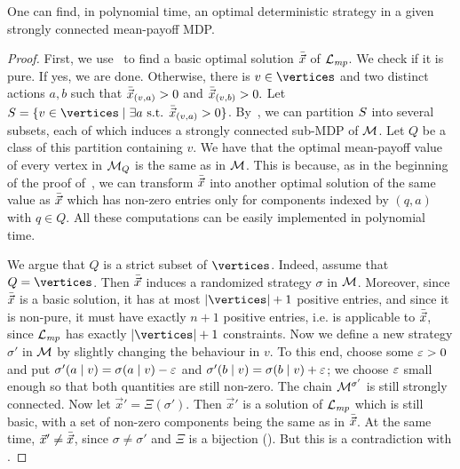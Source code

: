 \begin{theorem}
\label{5-thm:lpmp-basic-dim}
One can find, in polynomial time, an optimal deterministic strategy in a given strongly connected  mean-payoff MDP.
\end{theorem}
\begin{proof}
First, we use~ to find a basic optimal solution $\bar{\vec{x}}$ of $\mathcal{L}_{\mathit{mp}}$.
We check if it is pure. If yes, we are done. Otherwise,
%
there is $v\in \vertices$ and two distinct actions $a,b$ such that $\bar{\vec{x}}_{(v,a)}>0$ and $\bar{\vec{x}}_{(v,b)}>0.$ Let $ S = \{v \in \vertices\mid \exists a \text{ s.t. }\lpsol{x}_{(v,a)}>0\} $. By~, we can partition $S$ into several subsets, each of which induces a strongly connected sub-MDP of $\mathcal{M}$. Let $Q$ be a class of this partition containing $v$. We have that the optimal mean-payoff value of every vertex in $\mathcal{M}_Q$ is the same as in $\mathcal{M}$. This is because, 
as in the beginning of the proof of~, we can transform $\bar{\vec{x}}$ into another optimal solution of the same value as $\bar{\vec{x}}$ which has non-zero entries only for components indexed by $(q,a)$ with $q\in Q$. All these computations can be easily implemented in polynomial time. 

We argue that $Q$ is a strict subset of $\vertices$. Indeed, assume that $Q=\vertices$. Then $\bar{\vec{x}}$ induces a randomized strategy $\sigma$ in $\mathcal{M}$. Moreover, since $\bar{\vec{x}}$ is a basic solution, it has at most $|\vertices|+1$ positive entries, and since it is non-pure, it must have exactly $n+1$ positive entries, i.e.  is applicable to $\bar{\vec{x}}$, since $\mathcal{L}_{\mathit{mp}}$ has exactly $|\vertices|+1$ constraints. Now we define a new strategy $\sigma'$ in $\mathcal{M}$ by slightly changing the behaviour in $v$. To this end, choose some $\varepsilon>0$ and put $\sigma'(a\mid v)=\sigma(a\mid v)-\varepsilon$ and $\sigma'(b\mid v)=\sigma(b\mid v)+\varepsilon$; we choose $\varepsilon$ small enough so that both quantities are still non-zero. The chain $\mathcal{M}^{\sigma'}$ is still strongly connected. Now let $\vec{x}' = \Xi(\sigma')$. Then $\vec{x}'$ is a solution of $\mathcal{L}_{\mathit{mp}}$ which is still basic, with a set of non-zero components being the same as in $\bar{\vec{x}}$. At the same time, $\vec{x}'\neq \bar{\vec{x}}$, since $\sigma\neq {\sigma'}$ and $\Xi$ is a bijection (). But this is a contradiction with .


\end{proof}
